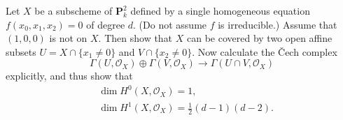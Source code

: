 \documentclass[10pt]{article}
\theoremstyle{definition}
\theoremstyle{remark}
\numberwithin{equation}{section}
\numberwithin{figure}{subsubsection}
\newcommand{\OO}{\mathcal{O}}
\begin{document}
\begin{problem}
  Let $X$ be a subscheme of $\mathbf{P}^2_k$ defined by a single homogeneous
  equation $f(x_0,x_1,x_2) = 0$ of degree $d$. (Do not assume $f$ is
  irreducible.) Assume that $(1,0,0)$ is not on $X$. Then show that $X$ can be
  covered by two open affine subsets $U = X \cap \{x_1 \ne 0\}$ and $V \cap
  \{x_2 \ne 0\}$. Now calculate the \v{C}ech complex
  \begin{equation*}
    \Gamma(U,\OO_X) \oplus \Gamma(V,\OO_X) \to \Gamma(U \cap V,\OO_X)
  \end{equation*}
  explicitly, and thus show that
  \begin{align*}
    &\dim H^0(X,\OO_X) = 1,\\
    &\dim H^1(X,\OO_X) = \frac{1}{2}(d-1)(d-2).
  \end{align*}
\end{problem}
\end{document}
